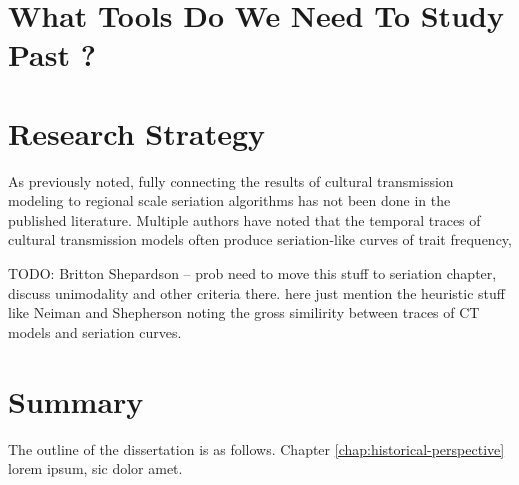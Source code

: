 \section{What Tools Do We Need To Study Past \CT?}
\label{sec:ct-archy-questions}



\section{Research Strategy}
\label{sec:research-strategy}



As previously noted, fully connecting the results of cultural transmission modeling to regional scale seriation algorithms has not been done in the published literature.  Multiple authors \citep[e.g.][]{Lipo1997,Neiman1990,Neiman1995,shepardson2006} have noted that the temporal traces of cultural transmission models often produce seriation-like curves of trait frequency, 

TODO:
Britton Shepardson -- prob need to move this stuff to seriation chapter, discuss unimodality and other criteria there.  here just mention the heuristic stuff like Neiman and Shepherson noting the gross similirity between traces of CT models and seriation curves.



\section{Summary}
\label{sec:plan-of-book}

The outline of the dissertation is as follows. Chapter \ref{chap:historical-perspective} lorem ipsum, sic dolor amet.  

\lipsum[3]





